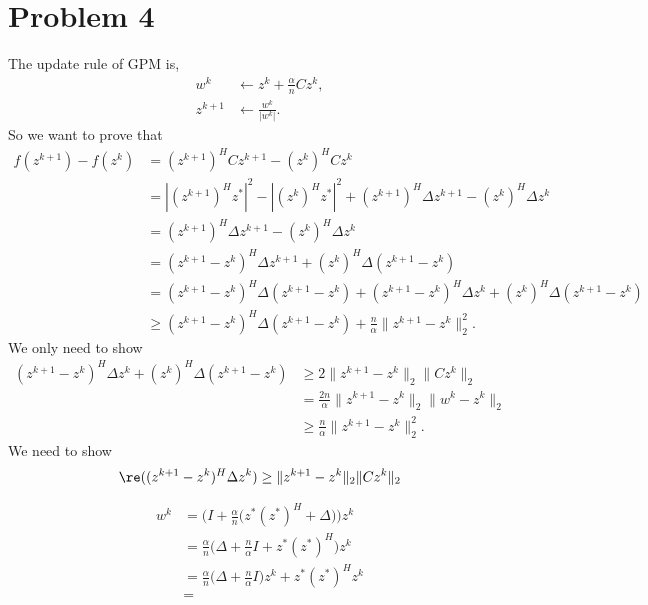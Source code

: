 \clearpage
\section{Problem 4}

The update rule of GPM is,
\begin{equation}
\begin{split}
    w^k &\leftarrow z^k+\frac{\alpha}{n}Cz^k, \\
    z^{k+1} &\leftarrow \frac{w^k}{|w^k|}.
\end{split}
\end{equation}
So we want to prove that
\begin{equation}
\begin{split}
    f(z^{k+1})-f(z^k)
    &= (z^{k+1})^HCz^{k+1} - (z^k)^HCz^k \\
    &= |(z^{k+1})^Hz^*|^2 - |(z^k)^Hz^*|^2 +
        (z^{k+1})^H\Delta z^{k+1} - (z^k)^H\Delta z^k \\
    &= (z^{k+1})^H\Delta z^{k+1} - (z^k)^H\Delta z^k \\
    &= (z^{k+1}-z^k)^H\Delta z^{k+1} + (z^k)^H\Delta (z^{k+1}-z^k) \\
    &= (z^{k+1}-z^k)^H\Delta (z^{k+1}-z^k) + (z^{k+1}-z^k)^H\Delta z^k + (z^k)^H\Delta (z^{k+1}-z^k) \\
    &\ge (z^{k+1}-z^k)^H\Delta (z^{k+1}-z^k) + \frac{n}{\alpha}\|z^{k+1}-z^k\|_2^2.
\end{split}
\end{equation}
We only need to show
\begin{equation}
\begin{split}
    (z^{k+1}-z^k)^H\Delta z^k + (z^k)^H\Delta (z^{k+1}-z^k)
    &\ge 2\|z^{k+1}-z^k\|_2\|Cz^k\|_2 \\
    &= \frac{2n}{\alpha}\|z^{k+1}-z^k\|_2\|w^k-z^k\|_2 \\
    &\ge \frac{n}{\alpha}\|z^{k+1}-z^k\|_2^2.
\end{split}
\end{equation}
We need to show
\begin{equation}
    \re((z^{k+1}-z^k)^H\Delta z^k) \ge
    \|z^{k+1}-z^k\|_2\|Cz^k\|_2
\end{equation}

\begin{equation}
\begin{split}
    w^k
    &=\bigg(I+\frac{\alpha}{n}\bigg(z^*(z^*)^H+\Delta\bigg)\bigg)z^k \\
    &=\frac{\alpha}{n}\bigg(\Delta+\frac{n}{\alpha}I+z^*(z^*)^H\bigg)z^k  \\
    &=\frac{\alpha}{n}\bigg(\Delta+\frac{n}{\alpha}I\bigg)z^k+z^*(z^*)^Hz^k  \\
    &=
\end{split}
\end{equation}
